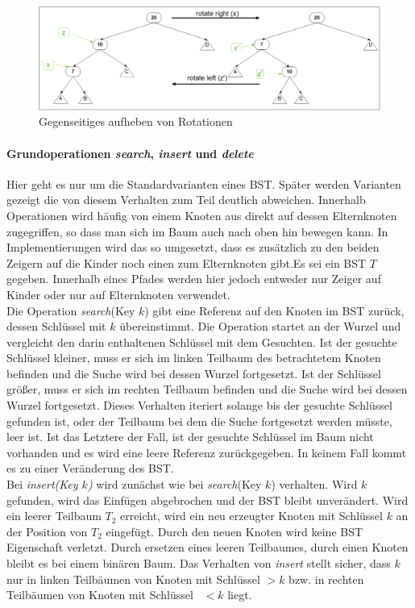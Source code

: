 \documentclass[a4paper,12pt]{article}
\begin{document}
\begin{figure}[h]
	\centering
	\includegraphics[width= 1.2\textwidth]{"Medien/Einleitung/LinksRechtsRotation"}
	\caption{Gegenseitiges aufheben von Rotationen}
	\label{fig:LinksRechtsRotation}
\end{figure}

\paragraph{Grundoperationen \textit{search}, \textit{insert} und \textit{delete}} \label{BST Operationen}
Hier geht es nur um die Standardvarianten eines BST. Später werden Varianten gezeigt die von diesem Verhalten zum Teil deutlich abweichen. Innerhalb Operationen wird häufig von einem Knoten aus direkt
auf dessen Elternknoten zugegriffen, so dass man sich im Baum auch nach oben hin bewegen kann. In Implementierungen wird das so umgesetzt, dass es zusätzlich zu den beiden Zeigern auf die Kinder noch einen zum Elternknoten gibt.Es sei ein BST $T$ gegeben. Innerhalb eines Pfades werden hier jedoch entweder nur Zeiger auf Kinder oder nur auf Elternknoten verwendet.  \\
Die Operation \textit{search}(Key $k$) gibt eine Referenz auf den Knoten im BST zurück, dessen Schlüssel mit $k$ übereinstimmt. Die Operation startet an der Wurzel und vergleicht den darin enthaltenen Schlüssel mit dem Gesuchten. Ist der gesuchte Schlüssel kleiner, muss er sich im linken Teilbaum des betrachtetem Knoten befinden und die Suche wird bei dessen Wurzel fortgesetzt. Ist der Schlüssel größer, muss er sich im rechten Teilbaum befinden und die Suche wird bei dessen Wurzel fortgesetzt. Dieses Verhalten iteriert solange bis der gesuchte Schlüssel gefunden ist, oder der Teilbaum bei dem die Suche fortgesetzt werden müsste, leer ist. Ist das Letztere der Fall, ist der gesuchte Schlüssel im Baum nicht vorhanden und es wird eine leere Referenz zurückgegeben. In keinem Fall kommt es zu einer Veränderung des BST.\\
Bei \textit{insert(Key $k$)} wird zunächst wie bei  \textit{search}(Key $k$) verhalten. Wird $k$ gefunden, wird das Einfügen abgebrochen und der BST bleibt unverändert. Wird ein leerer Teilbaum $T_2$ erreicht, wird ein neu erzeugter Knoten mit Schlüssel $k$ an der Position von $T_2$ eingefügt. Durch den neuen Knoten wird keine BST Eigenschaft verletzt. Durch ersetzen eines leeren Teilbaumes, durch einen Knoten bleibt es bei einem binären Baum. Das Verhalten von  \textit{insert} stellt sicher, dass $k$ nur in linken Teilbäumen von Knoten mit Schlüssel $> k$ bzw. in rechten Teilbäumen von Knoten mit Schlüssel~ $< k$ liegt.    \\
\end{document}
